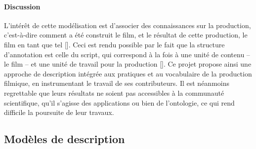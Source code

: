 \paragraph{Discussion}
L'intérêt de cette modélisation est d'associer des connaissances sur la production, c'est-à-dire comment a été construit le film, et le résultat de cette production, le film en tant que tel [].
Ceci est rendu possible par le fait que la structure d'annotation est celle du script, qui correspond à la fois à une unité de contenu -- le film -- et une unité de travail pour la production [].
Ce projet propose ainsi une approche de description intégrée aux pratiques et au vocabulaire de la production filmique, en instrumentant le travail de ses contributeurs.
Il est néanmoins regrettable que leurs résultats ne soient pas accessibles à la communauté scientifique, qu'il s'agisse des applications ou bien de l'ontologie, ce qui rend difficile la poursuite de leur travaux. 






\subsection{Modèles de description }\label{sec:post}



